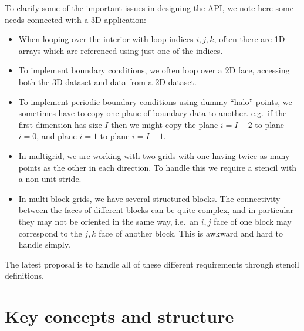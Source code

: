 \documentclass[11pt]{article}
\begin{document}
\noindent To clarify some of the important issues in designing the API, we note here some needs connected with a 3D
application:
\begin{itemize}
\item
When looping over the interior with loop indices $i,j,k$, often there are 1D arrays which are referenced using just one 
of the indices.

\item
To implement boundary conditions, we often loop over a 2D face, accessing both the 3D dataset and data from a 2D 
dataset.

\item
To implement periodic boundary conditions using dummy ``halo'' points, we sometimes have to copy one plane of boundary 
data to another.  e.g.~if the first dimension has size $I$ then we might copy the plane $i=I\!-\!2$ to plane $i=0$, and 
plane $i=1$ to plane $i=I\!-\!1$.

\item
In multigrid, we are working with two grids with one having twice as many points as the other in each direction.  To 
handle this we require a stencil with a non-unit stride.

\item
In multi-block grids, we have several structured blocks. The connectivity between the faces of different blocks can 
be quite complex, and in particular they may not be oriented in the same way, i.e.~an $i,j$ face of one block may 
correspond to the $j,k$ face of another block.  This is awkward and hard to handle simply.
\end{itemize}

\noindent The latest proposal is to handle all of these different requirements through stencil definitions.

\section{Key concepts and structure}
\end{document}
